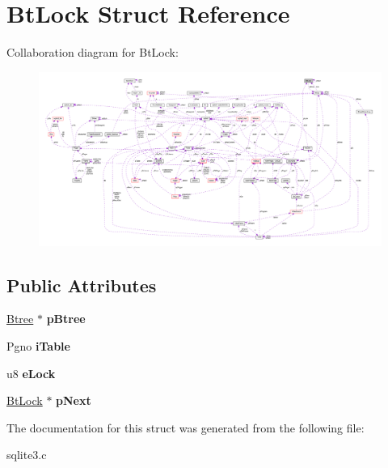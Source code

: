 \hypertarget{struct_bt_lock}{\section{Bt\-Lock Struct Reference}
\label{struct_bt_lock}
}


Collaboration diagram for Bt\-Lock\-:\nopagebreak
\begin{figure}[H]
\begin{center}
\leavevmode
\includegraphics[width=350pt]{struct_bt_lock__coll__graph}
\end{center}
\end{figure}
\subsection*{Public Attributes}
\begin{DoxyCompactItemize}
\item 
\hypertarget{struct_bt_lock_ab9125b8e79d480b75f3af21cb2ab55c7}{\hyperlink{struct_btree}{Btree} $\ast$ {\bfseries p\-Btree}}\label{struct_bt_lock_ab9125b8e79d480b75f3af21cb2ab55c7}

\item 
\hypertarget{struct_bt_lock_a822efcf018d6c8eb343341cde5df980d}{Pgno {\bfseries i\-Table}}\label{struct_bt_lock_a822efcf018d6c8eb343341cde5df980d}

\item 
\hypertarget{struct_bt_lock_abe07b71018ee423e0d94b5cdba044b5c}{u8 {\bfseries e\-Lock}}\label{struct_bt_lock_abe07b71018ee423e0d94b5cdba044b5c}

\item 
\hypertarget{struct_bt_lock_ad42de86209c7aab43604c52a549b7bca}{\hyperlink{struct_bt_lock}{Bt\-Lock} $\ast$ {\bfseries p\-Next}}\label{struct_bt_lock_ad42de86209c7aab43604c52a549b7bca}

\end{DoxyCompactItemize}


The documentation for this struct was generated from the following file\-:\begin{DoxyCompactItemize}
\item 
sqlite3.\-c\end{DoxyCompactItemize}
